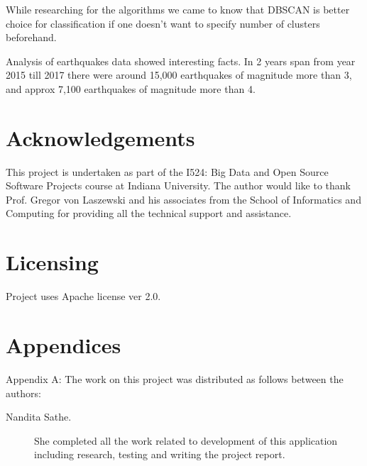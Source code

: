 \documentclass[9pt,twocolumn,twoside]{../../styles/osajnl}
\begin{document}
While researching for the algorithms we came to know that DBSCAN is better choice for classification if one doesn't want to specify number of clusters beforehand.

Analysis of earthquakes data showed interesting facts. In 2 years span from year 2015 till 2017 there were around 15,000 earthquakes of magnitude more than 3, and approx 7,100 earthquakes of magnitude more than 4.

\section {Acknowledgements}

This project is undertaken as part of the I524: Big Data and Open Source Software Projects course at Indiana University. The author would like to thank Prof. Gregor von Laszewski and his associates from the School of Informatics and Computing for providing all the technical support and assistance.

\section {Licensing}

Project uses Apache license ver 2.0.




 
\newpage

\section{Appendices}

Appendix A: The work on this project was distributed as follows between the
authors:

\begin{description}

\item[Nandita Sathe.] She completed all the work related to development of this application including research, testing and writing the project report. 

\end{description}
\end{document}
